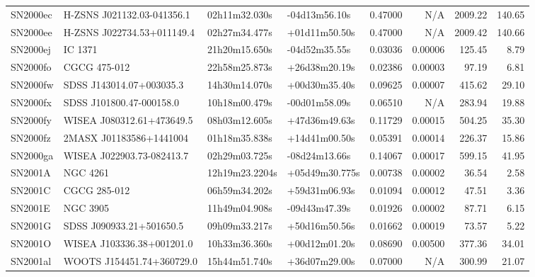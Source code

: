 \begin{longtable}{llllrrrr}
SN2000ec         &      H-ZSNS J021132.03-041356.1 &   02h11m32.030s &   -04d13m56.10s &  0.47000 &      N/A &  2009.22 &      140.65 \\
SN2000ee         &      H-ZSNS J022734.53+011149.4 &   02h27m34.477s &   +01d11m50.50s &  0.47000 &      N/A &  2009.42 &      140.66 \\
SN2000ej         &                         IC 1371 &   21h20m15.650s &   -04d52m35.55s &  0.03036 &  0.00006 &   125.45 &        8.79 \\
SN2000fo         &                    CGCG 475-012 &   22h58m25.873s &   +26d38m20.19s &  0.02386 &  0.00003 &    97.19 &        6.81 \\
SN2000fw         &        SDSS J143014.07+003035.3 &   14h30m14.070s &   +00d30m35.40s &  0.09625 &  0.00007 &   415.62 &       29.10 \\
SN2000fx         &        SDSS J101800.47-000158.0 &   10h18m00.479s &   -00d01m58.09s &  0.06510 &      N/A &   283.94 &       19.88 \\
SN2000fy         &       WISEA J080312.61+473649.5 &   08h03m12.605s &   +47d36m49.63s &  0.11729 &  0.00015 &   504.25 &       35.30 \\
SN2000fz         &         2MASX J01183586+1441004 &   01h18m35.838s &   +14d41m00.50s &  0.05391 &  0.00014 &   226.37 &       15.86 \\
SN2000ga         &       WISEA J022903.73-082413.7 &   02h29m03.725s &   -08d24m13.66s &  0.14067 &  0.00017 &   599.15 &       41.95 \\
SN2001A          &                        NGC 4261 &  12h19m23.2204s &  +05d49m30.775s &  0.00738 &  0.00002 &    36.54 &        2.58 \\
SN2001C          &                    CGCG 285-012 &   06h59m34.202s &   +59d31m06.93s &  0.01094 &  0.00012 &    47.51 &        3.36 \\
SN2001E          &                        NGC 3905 &   11h49m04.908s &   -09d43m47.39s &  0.01926 &  0.00002 &    87.71 &        6.15 \\
SN2001G          &        SDSS J090933.21+501650.5 &   09h09m33.217s &   +50d16m50.56s &  0.01662 &  0.00019 &    73.57 &        5.22 \\
SN2001O          &       WISEA J103336.38+001201.0 &   10h33m36.360s &   +00d12m01.20s &  0.08690 &  0.00500 &   377.36 &       34.01 \\
SN2001al         &       WOOTS J154451.74+360729.0 &   15h44m51.740s &   +36d07m29.00s &  0.07000 &      N/A &   300.99 &       21.07 \\

\end{longtable}
